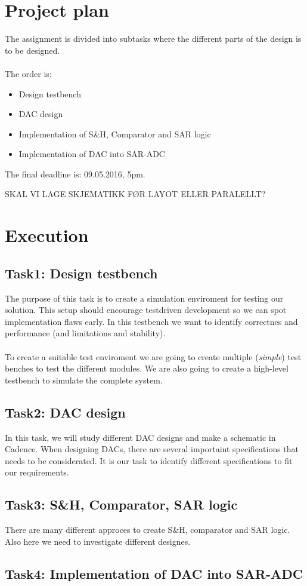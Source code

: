 \documentclass[english, 12pt, a4paper]{ifimaster}
\begin{document}
\section*{Project plan}
The assignment is divided into subtasks where the different parts of the design is to be designed.\\
\\
The order is: 
\begin{itemize}
 \item Design testbench
 \item DAC design
 \item Implementation of S\&H, Comparator and SAR logic
 \item Implementation of DAC into SAR-ADC
\end{itemize}
The final deadline is: 09.05.2016, 5pm.

SKAL VI LAGE SKJEMATIKK FØR LAYOT ELLER PARALELLT?

\section*{Execution}

\subsection*{Task1: Design testbench}
The purpose of this task is to create a simulation enviroment for testing our solution. This setup should encourage testdriven development so we can spot implementation flaws early.
In this testbench we want to identify correctnes and performance (and limitations and stability).\\
\\
To create a suitable test enviroment we are going to create multiple (\textit{simple}) test benches to test the different modules.
We are also going to create a high-level testbench to simulate the complete system.

\subsection*{Task2: DAC design}
In this task, we will study different DAC designs and make a schematic in Cadence. When designing DACs, there are several importaint specifications that needs to be considerated. It is
our task to identify different specifications to fit our requirements.

\subsection*{Task3: S\&H, Comparator, SAR logic}
There are many different approces to create S\&H, comparator and SAR logic. Also here we need to investigate different designes.


\subsection*{Task4: Implementation of DAC into SAR-ADC}
\end{document}

